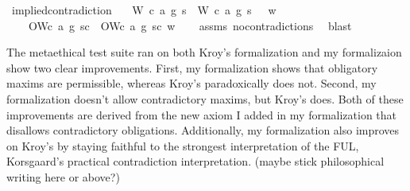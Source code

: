 \begin{isabellebody}
{}%
\endisatagproof
{\isafoldproof}%
%
\isadelimproof
\isanewline
%
\endisadelimproof
\isanewline
{}\isamarkupfalse%
\ implied{\isacharunderscore}contradiction{\isacharcolon}\isanewline
\ \ \ {\isachardoublequoteopen}{\isacharparenleft}{\isacharparenleft}{\isacharparenleft}W\ {\isacharparenleft}c{}{\isacharcomma}\ a{}{\isacharcomma}\ g{}{\isacharparenright}\ s{\isacharparenright}\ \isactrlbold {\isasymand}\ {\isacharparenleft}W\ {\isacharparenleft}c{}{\isacharcomma}\ a{}{\isacharcomma}\ g{}{\isacharparenright}\ s{\isacharparenright}{\isacharparenright}\ \isactrlbold {\isasymrightarrow}\ \isactrlbold {\isasymbottom}{\isacharparenright}\ w{\isachardoublequoteclose}\isanewline
\ \ \ {\isachardoublequoteopen}\isactrlbold {\isasymnot}\ {\isacharparenleft}O{\isacharbraceleft}W{\isacharparenleft}c{}{\isacharcomma}\ a{}{\isacharcomma}\ g{}{\isacharparenright}\ s{\isacharbar}c{\isacharbraceright}\ \isactrlbold {\isasymand}\ O{\isacharbraceleft}W{\isacharparenleft}c{}{\isacharcomma}\ a{}{\isacharcomma}\ g{}{\isacharparenright}\ s{\isacharbar}c{\isacharbraceright}{\isacharparenright}\ w{\isachardoublequoteclose}\isanewline
%
\isadelimproof
\ \ %
\endisadelimproof
%
\isatagproof
{}\isamarkupfalse%
\ assms\ no{\isacharunderscore}contradictions\ \isamarkupfalse%
\ blast\isanewline
%
%
\endisatagproof
{\isafoldproof}%
%
\isadelimproof
%
\endisadelimproof
%
\begin{isamarkuptext}%
The metaethical test suite ran on both Kroy's formalization and my formalizaion show two clear 
improvements. First, my formalization shows that obligatory maxims are permissible, whereas Kroy's 
paradoxically does not. Second, my formalization doesn't allow contradictory maxims, but Kroy's does. 
Both of these improvements are derived from the new axiom I added in my formalization that disallows 
contradictory obligations. Additionally, my formalization also improves on Kroy's by staying faithful to the 
strongest interpretation of the FUL, Korsgaard's practical contradiction interpretation. (maybe stick 
philosophical writing here or above?)%
\end{isamarkuptext}\isamarkuptrue%
%
\isadelimdocument
%
\endisadelimdocument

\end{isabellebody}
